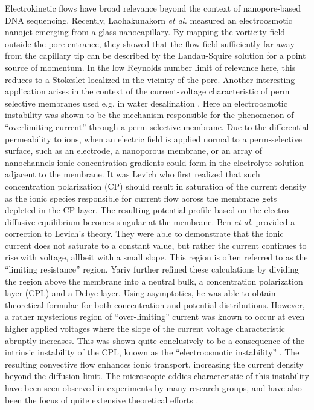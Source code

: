 Electrokinetic flows have broad relevance beyond the context of nanopore-based DNA sequencing. Recently, Laohakunakorn {\it et al.} \cite{ghosal2013Nanoletter} measured an electroosmotic nanojet emerging from a glass nanocapillary. By mapping the vorticity field outside the pore entrance, they showed that the flow field sufficiently far away from the capillary tip can be described by the Landau-Squire solution for a point source of momentum. In the low Reynolds number limit of relevance here, this reduces to a Stokeslet localized in the vicinity of the pore. Another interesting application arises in the context of the current-voltage characteristic of perm selective membranes used e.g. in water desalination \cite{rubinstein2005electroconvective, kim2010direct}.
Here an electroosmotic instability was shown to be the mechanism responsible for the phenomenon of ``overlimiting current'' through a perm-selective membrane. Due to the differential permeability to ions, when an electric field is applied 
normal to a perm-selective surface, such as an electrode, a nanoporous membrane, or an array of nanochannels \cite{Vlassiouk2008a} ionic concentration gradients could form in the electrolyte solution adjacent to the membrane. It was Levich \cite{Levich} who first realized that such concentration polarization (CP) should result in saturation of the current density as the ionic species responsible for current flow across the membrane gets depleted in the CP layer. The resulting potential profile based on the electro-diffusive equilibrium becomes singular at the membrane. Ben {\it et al.} \cite{Ben2002} provided a correction to Levich's theory.  They were able to demonstrate that the ionic current does not saturate to a constant value, but rather the current continues to rise with voltage, allbeit with a small slope. 
 This region is often referred to as the ``limiting resistance'' region. Yariv \cite{Yariv2009} further refined these calculations by dividing the region above the membrane into a neutral bulk, a concentration polarization layer (CPL) and a Debye layer. Using asymptotics, he was able to obtain theoretical formulae for both concentration and potential distributions. However, a rather mysterious region of ``over-limiting'' current was known to occur at even higher applied voltages where the slope of the current voltage characteristic abruptly increases. This was shown quite conclusively to be a consequence of the 
 intrinsic instability of the CPL, known as the ``electroosmotic instability'' \cite{Rubinstein1979,rubinstein2005electroconvective,ZALTZMAN2007}. The resulting convective flow enhances ionic transport, increasing the current density beyond the diffusion limit. The microscopic eddies characteristic of this instability have been seen observed in experiments by many research groups, and have also been the focus of 
 quite extensive theoretical efforts \cite{rubinstein2000electro,rubinstein2008direct,dydek2011overlimiting,deng2013overlimiting,chinaryan2014effect,Yossifon2008,yossifon2009nonlinear,Chang2011,kim2007concentration}. 

